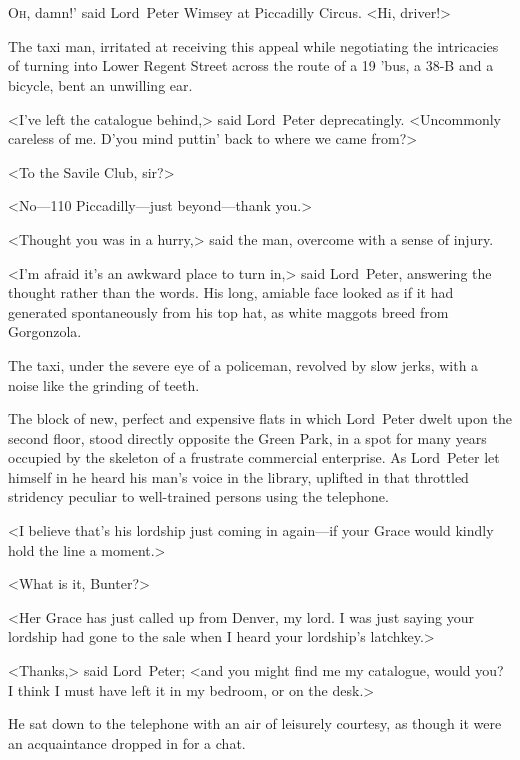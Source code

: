 \chapter[Chapter \thechapter]{}
\lettrine[ante=‘]{O}{h}, damn!' said Lord~Peter Wimsey at Piccadilly Circus. <Hi, driver!>

\zz
The taxi man, irritated at receiving this appeal while negotiating the intricacies of turning into Lower Regent Street across the route of a 19 'bus, a 38-B and a bicycle, bent an unwilling ear.

<I've left the catalogue behind,> said Lord~Peter deprecatingly. <Uncommonly careless of me. D'you mind puttin' back to where we came from?>

<To the Savile Club, sir?>

<No—110 Piccadilly—just beyond—thank you.>

<Thought you was in a hurry,> said the man, overcome with a sense of injury.

<I'm afraid it's an awkward place to turn in,> said Lord~Peter, answering the thought rather than the words. His long, amiable face looked as if it had generated spontaneously from his top hat, as white maggots breed from Gorgonzola.

The taxi, under the severe eye of a policeman, revolved by slow jerks, with a noise like the grinding of teeth.

The block of new, perfect and expensive flats in which Lord~Peter dwelt upon the second floor, stood directly opposite the Green Park, in a spot for many years occupied by the skeleton of a frustrate commercial enterprise. As Lord~Peter let himself in he heard his man's voice in the library, uplifted in that throttled stridency peculiar to well-trained persons using the telephone.

<I believe that's his lordship just coming in again—if your Grace would kindly hold the line a moment.>

<What is it, Bunter?>

<Her Grace has just called up from Denver, my lord. I was just saying your lordship had gone to the sale when I heard your lordship's latchkey.>

<Thanks,> said Lord~Peter; <and you might find me my catalogue, would you? I think I must have left it in my bedroom, or on the desk.>

He sat down to the telephone with an air of leisurely courtesy, as though it were an acquaintance dropped in for a chat.

